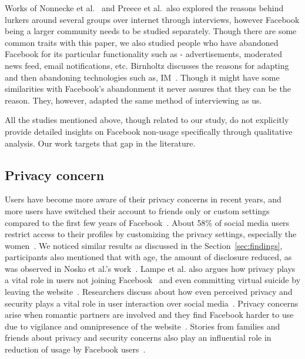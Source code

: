 Works of Nonnecke et al.~\cite{nonnecke2001lurkers} and Preece et al.~\cite{preece2004top}also explored the reasons behind lurkers around several groups over internet through interviews, however Facebook being a larger community needs to be studied separately. Though there are some common traits with this paper, we also studied people who have abandoned Facebook for its particular functionality such as - advertisements, moderated news feed, email notifications, etc. Birnholtz discusses the reasons for adapting and then abandoning technologies such as, IM~\cite{birnholtz2010adopt}. Though it might have some similarities with Facebook's abandonment it never assures that they can be the reason. They, however, adapted the same method of interviewing as us.

All the studies mentioned above, though related to our study, do not explicitly provide detailed insights on Facebook non-usage specifically through qualitative analysis. Our work targets that gap in the literature.
\subsection{Privacy concern}
Users have become more aware of their privacy concerns in recent years, and more users have switched their account to friends only or custom settings compared to the first few years of Facebook~\cite{fuchs2012political,madden2012privacy}. About 58\% of social media users restrict access to their profiles by customizing the privacy settings, especially the women~\cite{madden2012privacy}. We noticed similar results as discussed in the Section~\ref{sec:findings}, participants also mentioned that with age, the amount of disclosure reduced, as was observed in Nosko et al.'s work~\cite{nosko2010all}. Lampe et al. also argues how privacy plays a vital role in users not joining Facebook~\cite{lampe2013users} and even committing virtual suicide by leaving the website~\cite{stieger2013commits}. Researchers discuss about how even perceived privacy and security plays a vital role in user interaction over social media~\cite{jung2016imagined,shin2010effects}. Privacy concerns arise when romantic partners are involved and they find Facebook harder to use due to vigilance and omnipresence of the website~\cite{gershon2011friend,madden2006online,zhao2012s}. Stories from families and friends about privacy and security concerns also play an influential role in reduction of usage by Facebook users~\cite{rader2012stories}.
